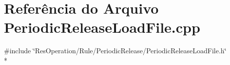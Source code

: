 \section{Referência do Arquivo Periodic\+Release\+Load\+File.\+cpp}
\label{_2_rule_2_periodic_release_2_periodic_release_load_file_8cpp}
{\ttfamily \#include \char`\"{}Res\+Operation/\+Rule/\+Periodic\+Release/\+Periodic\+Release\+Load\+File.\+h\char`\"{}}\\*
